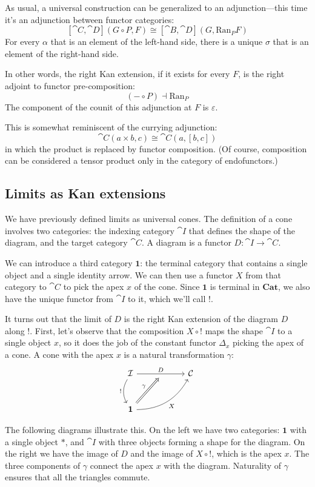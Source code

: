 \documentclass[DaoFP]{subfiles}
\begin{document}
As usual, a universal construction can be generalized to an adjunction---this time it's an adjunction between functor categories:
\[ [\cat C, \cat D](G \circ P, F) \cong [\cat B, \cat D](G, \text{Ran}_P F) \]
For every $\alpha$ that is an element of the left-hand side, there is a unique $\sigma$ that is an element of the right-hand side.

In other words, the right Kan extension, if it exists for every $F$, is the right adjoint to functor pre-composition:
\[ (- \circ P) \dashv \text{Ran}_P \]
The component of the counit of this adjunction at $F$ is $\varepsilon$.

This is somewhat reminiscent of the currying adjunction:
\[ \cat C (a \times b, c) \cong \cat C (a, [b, c]) \]
in which the product is replaced by functor composition. (Of course, composition can be considered a tensor product only in the category of endofunctors.)

\subsection{Limits as Kan extensions}
 We have previously defined limits as universal cones. The definition of a cone involves two categories: the indexing category $\cat I$ that defines the shape of the diagram, and the target category $\cat C$. A diagram is a functor $D \colon \cat I \to \cat C$. 
 
 We can introduce a third category $\mathbf 1$: the terminal category that contains a single object and a single identity arrow. We can then use a functor $X$ from that category to $\cat C$ to pick the apex $x$ of the cone. Since $\mathbf 1$ is terminal in $\mathbf{Cat}$, we also have the unique functor from $\cat I$ to it, which we'll call $!$.
 
It turns out that the limit of $D$ is the right Kan extension of the diagram $D$ along $!$. First, let's observe that the composition $X \circ !$ maps the shape $\cat I$ to a single object $x$, so it does the job of the constant functor $\Delta_x$ picking the apex of a cone. A cone with the apex $x$ is a natural transformation $\gamma$: 
\[
 \begin{tikzcd} [row sep=1cm, column sep=1cm]
 \cat I
 \arrow[rr, "D", "" {name=ID, below} ]
 \arrow[d, bend right, "!"']
 && \cat C
 \\
 \mathbf 1
  \arrow[urr, bend right, "X"']
 \arrow[Rightarrow, "\gamma",  to=ID]
 \end{tikzcd}
\]

The following diagrams illustrate this. On the left we have two categories: $\mathbf 1$ with a single object $*$, and $\cat I$ with three objects forming a shape for the diagram. On the right we have the image of $D$ and the image of $X \circ !$, which is the apex $x$. The three components of $\gamma$ connect the apex $x$ with the diagram. Naturality of $\gamma$ ensures that all the triangles commute.
\end{document}
